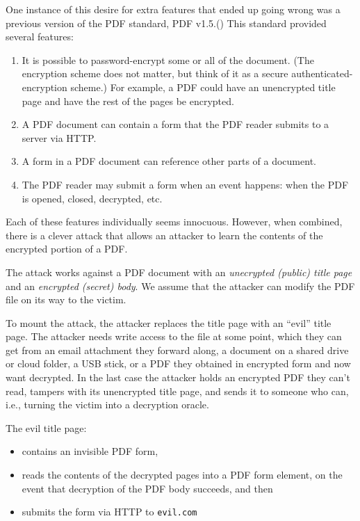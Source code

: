 \documentclass[
  letterpaper,
]{scrbook}
\providecommand{\tightlist}{%
  \setlength{\itemsep}{0pt}\setlength{\parskip}{0pt}}
\theoremstyle{definition}
\theoremstyle{plain}
\theoremstyle{plain}
\theoremstyle{remark}
\begin{document}
One instance of this desire for extra features that ended up going wrong
was a previous version of the PDF standard, PDF
v1.5.() This
standard provided several features:

\begin{enumerate}
\def\labelenumi{\arabic{enumi}.}
\tightlist
\item
  It is possible to password-encrypt some or all of the document. (The
  encryption scheme does not matter, but think of it as a secure
  authenticated-encryption scheme.) For example, a PDF could have an
  unencrypted title page and have the rest of the pages be encrypted.
\item
  A PDF document can contain a form that the PDF reader submits to a
  server via HTTP.
\item
  A form in a PDF document can reference other parts of a document.
\item
  The PDF reader may submit a form when an event happens: when the PDF
  is opened, closed, decrypted, etc.
\end{enumerate}

Each of these features individually seems innocuous. However, when
combined, there is a clever attack that allows an attacker to learn the
contents of the encrypted portion of a PDF.

The attack works against a PDF document with an \emph{unecrypted
(public) title page} and an \emph{encrypted (secret) body}. We assume
that the attacker can modify the PDF file on its way to the victim.

To mount the attack, the attacker replaces the title page with an
``evil'' title page. The attacker needs write access to the file at some
point, which they can get from an email attachment they forward along, a
document on a shared drive or cloud folder, a USB stick, or a PDF they
obtained in encrypted form and now want decrypted. In the last case the
attacker holds an encrypted PDF they can't read, tampers with its
unencrypted title page, and sends it to someone who can, i.e., turning
the victim into a decryption oracle.

The evil title page:

\begin{itemize}
\tightlist
\item
  contains an invisible PDF form,
\item
  reads the contents of the decrypted pages into a PDF form element, on
  the event that decryption of the PDF body succeeds, and then
\item
  submits the form via HTTP to \texttt{evil.com}
\end{itemize}
\end{document}

